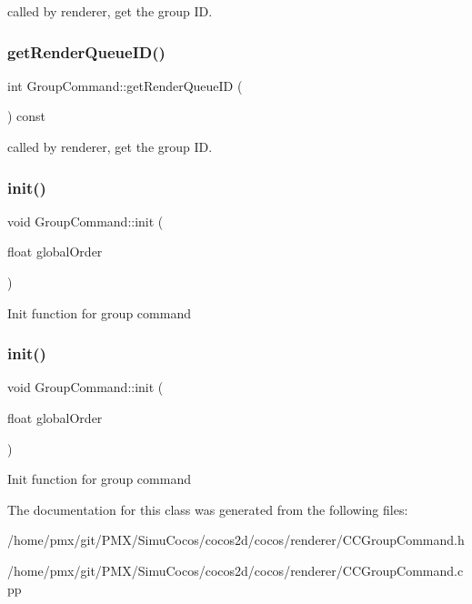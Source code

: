 called by renderer, get the group ID. \mbox{\label{classGroupCommand_adc611e80f004b605a81ec5ac6a3f0230}} 
\subsubsection{\texorpdfstring{get\+Render\+Queue\+I\+D()}{getRenderQueueID()}\hspace{0.1cm}{\footnotesize\ttfamily [2/2]}}
{\footnotesize\ttfamily int Group\+Command\+::get\+Render\+Queue\+ID (\begin{DoxyParamCaption}{ }\end{DoxyParamCaption}) const\hspace{0.3cm}{\ttfamily [inline]}}

called by renderer, get the group ID. \mbox{\label{classGroupCommand_a1764751efbb8a4baeb0753f9f89fde10}} 
\subsubsection{\texorpdfstring{init()}{init()}\hspace{0.1cm}{\footnotesize\ttfamily [1/2]}}
{\footnotesize\ttfamily void Group\+Command\+::init (\begin{DoxyParamCaption}\item[{float}]{global\+Order }\end{DoxyParamCaption})}

Init function for group command \mbox{\label{classGroupCommand_a1764751efbb8a4baeb0753f9f89fde10}} 
\subsubsection{\texorpdfstring{init()}{init()}\hspace{0.1cm}{\footnotesize\ttfamily [2/2]}}
{\footnotesize\ttfamily void Group\+Command\+::init (\begin{DoxyParamCaption}\item[{float}]{global\+Order }\end{DoxyParamCaption})}

Init function for group command 

The documentation for this class was generated from the following files\+:\begin{DoxyCompactItemize}
\item 
/home/pmx/git/\+P\+M\+X/\+Simu\+Cocos/cocos2d/cocos/renderer/C\+C\+Group\+Command.\+h\item 
/home/pmx/git/\+P\+M\+X/\+Simu\+Cocos/cocos2d/cocos/renderer/C\+C\+Group\+Command.\+cpp\end{DoxyCompactItemize}
